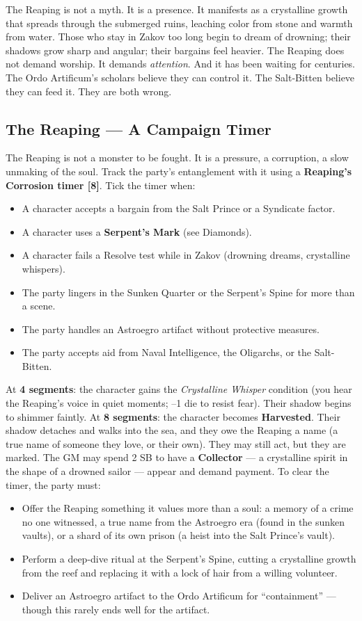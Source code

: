 \documentclass[12pt,oneside]{book}
\begin{document}
The Reaping is not a myth. It is a presence. It manifests as a crystalline growth that spreads through the submerged ruins, leaching color from stone and warmth from water. Those who stay in Zakov too long begin to dream of drowning; their shadows grow sharp and angular; their bargains feel heavier. The Reaping does not demand worship. It demands \textit{attention}. And it has been waiting for centuries. The Ordo Artificum's scholars believe they can control it. The Salt-Bitten believe they can feed it. They are both wrong.

\subsection*{The Reaping --- A Campaign Timer}
\label{sec:zakov-reaping}

The Reaping is not a monster to be fought. It is a pressure, a corruption, a slow unmaking of the soul. Track the party's entanglement with it using a \textbf{Reaping's Corrosion timer [8]}. Tick the timer when:
\begin{itemize}
  \item A character accepts a bargain from the Salt Prince or a Syndicate factor.
  \item A character uses a \textbf{Serpent's Mark} (see Diamonds).
  \item A character fails a Resolve test while in Zakov (drowning dreams, crystalline whispers).
  \item The party lingers in the Sunken Quarter or the Serpent's Spine for more than a scene.
  \item The party handles an Astroegro artifact without protective measures.
  \item The party accepts aid from Naval Intelligence, the Oligarchs, or the Salt-Bitten.
\end{itemize}
\noindent At \textbf{4 segments}: the character gains the \textit{Crystalline Whisper} condition (you hear the Reaping's voice in quiet moments; --1 die to resist fear). Their shadow begins to shimmer faintly. At \textbf{8 segments}: the character becomes \textbf{Harvested}. Their shadow detaches and walks into the sea, and they owe the Reaping a name (a true name of someone they love, or their own). They may still act, but they are marked. The GM may spend 2 SB to have a \textbf{Collector} --- a crystalline spirit in the shape of a drowned sailor --- appear and demand payment. To clear the timer, the party must:
\begin{itemize}
  \item Offer the Reaping something it values more than a soul: a memory of a crime no one witnessed, a true name from the Astroegro era (found in the sunken vaults), or a shard of its own prison (a heist into the Salt Prince's vault).
  \item Perform a deep-dive ritual at the Serpent's Spine, cutting a crystalline growth from the reef and replacing it with a lock of hair from a willing volunteer.
  \item Deliver an Astroegro artifact to the Ordo Artificum for ``containment'' --- though this rarely ends well for the artifact.
\end{itemize}
\end{document}
